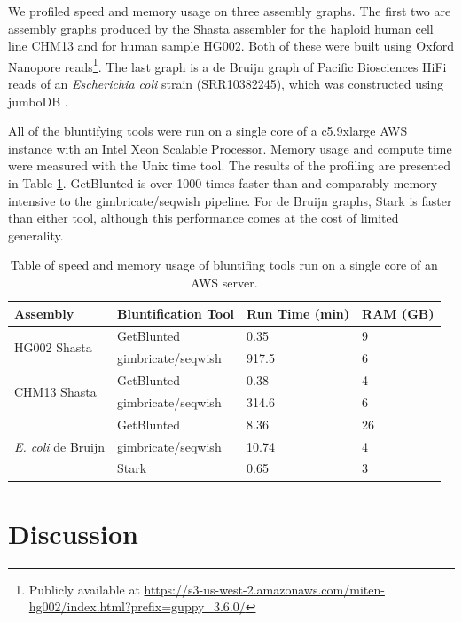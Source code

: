 \documentclass[11pt]{ucthesis}
\begin{document}
We profiled speed and memory usage on three assembly graphs.
The first two are assembly graphs produced by the Shasta assembler \cite{shafin_nanopore_2020} for the haploid human cell line CHM13 and for human sample HG002.
Both of these were built using Oxford Nanopore reads\footnote{Publicly available at \url{https://s3-us-west-2.amazonaws.com/miten-hg002/index.html?prefix=guppy\_3.6.0/}}.
The last graph is a de Bruijn graph of Pacific Biosciences HiFi reads of an \textit{Escherichia coli} strain (SRR10382245), which was constructed using jumboDB \cite{bankevich_assembling_2020}.

All of the bluntifying tools were run on a single core of a c5.9xlarge AWS instance with an Intel Xeon Scalable Processor.
Memory usage and compute time were measured with the Unix time tool.
The results of the profiling are presented in Table \ref{table:1}.
GetBlunted is over 1000 times faster than and comparably memory-intensive to the gimbricate/seqwish pipeline. 
For de Bruijn graphs, Stark is faster than either tool, although this performance comes at the cost of limited generality.


\begin{table}[h!]
\ssp
\begin{center}
\begin{tabular}{ ||p{2cm}|p{3cm}|p{2.75cm}|p{2cm}|| }
\hline
Assembly & Bluntification Tool & Run Time (min) & RAM (GB) \\
\hline
\multirow{2}{2cm}{HG002 Shasta} & GetBlunted & 0.35 & 9 \\ 
&  gimbricate/seqwish  & 917.5 &  6 \\ 
\hline
\multirow{2}{2cm}{CHM13 Shasta} & GetBlunted & 0.38 & 4 \\ 
&  gimbricate/seqwish  & 314.6 &  6 \\ 
\hline
\multirow{3}{2cm}{\emph{E. coli} de Bruijn} & GetBlunted & 8.36 & 26 \\ 
&  gimbricate/seqwish  & 10.74 &  4 \\
& Stark & 0.65 & 3\\
\hline
\end{tabular}
\end{center}
\caption{Table of speed and memory usage of bluntifing tools run on a single core of an AWS server.}
\label{table:1}
\end{table}

\section{Discussion}
\end{document}
